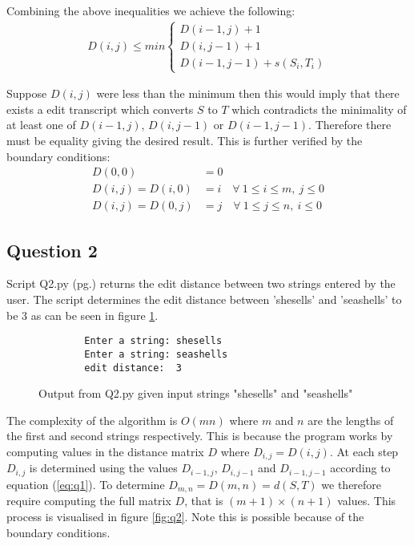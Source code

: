 \documentclass[a4paper]{article}
\begin{document}
Combining the above inequalities we achieve the following:
\begin{align*}
    D(i,j) \leq  min\begin{cases} D(i-1,j)+1 \\ D(i,j-1)+1 \\ D(i-1,j-1)+s(S_i,T_i) \end{cases}
\end{align*}

Suppose $D(i,j)$ were less than the minimum then this would imply that there exists a edit transcript which converts $S$ to $T$ which contradicts the minimality of at least one of $D(i-1,j)$, $D(i,j-1)$ or $D(i-1,j-1)$. Therefore there must be equality giving the desired result. This is further verified by the boundary conditions:
\begin{align*}
    D(0,0) &= 0 \\
    D(i,j) = D(i,0) &= i \quad \forall\ 1 \leq i \leq m,\ j\leq 0 \\
    D(i,j) = D(0,j) &= j \quad \forall\ 1 \leq j \leq n,\ i\leq 0
\end{align*}

\subsection*{Question 2}

Script Q2.py (pg.\pageref{PQ2}) returns the edit distance between two strings entered by the user. The script determines the edit distance between 'shesells' and 'seashells' to be 3 as can be seen in figure \ref{output:q2}.

\begin{figure}[H]
    \centering
    \begin{verbatim}
        Enter a string: shesells
        Enter a string: seashells
        edit distance:  3
    \end{verbatim}
    \caption{Output from Q2.py given input strings "shesells" and "seashells"}
    \label{output:q2}
\end{figure}

The complexity of the algorithm is $O(mn)$ where $m$ and $n$ are the lengths of the first and second strings respectively. This is because the program works by computing values in the distance matrix $D$ where $D_{i,j}=D(i,j)$. At each step $D_{i,j}$ is determined using the values $D_{i-1,j}$, $D_{i,j-1}$ and $D_{i-1,j-1}$ according to equation (\ref{eq:q1}). To determine $D_{m,n} = D(m,n) = d(S,T)$ we therefore require computing the full matrix $D$, that is $(m+1) \times (n+1)$ values. This process is visualised in figure \ref{fig:q2}. Note this is possible because of the boundary conditions.
\end{document}
